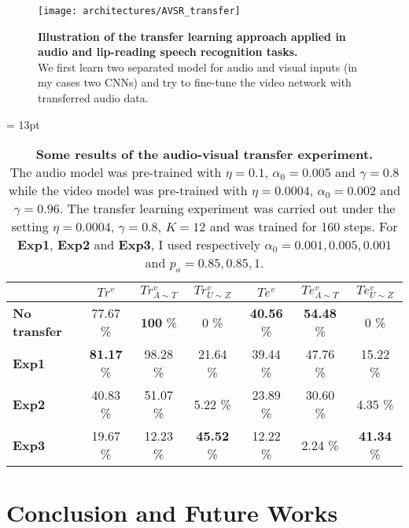 \begin{figure}[H]
  \centering
  \texttt{[image: architectures/AVSR\_transfer]}\\[-1em]
  \caption{%
    \textbf{Illustration of the transfer learning approach applied in
      audio and lip-reading speech recognition tasks.}\\[0.1em]
    We first learn two separated model for audio and visual inputs
      (in my cases two CNNs) and try to fine-tune the video network
      with transferred audio data.
    }
  \label{fig:AVSR_transfer}
\end{figure}

\begin{table}[H]
  \tabcolsep = 13pt
  \caption{\textbf{Some results of the audio-visual transfer experiment.}
    \\[0.1em]
  The audio model was pre-trained with $\eta=0.1$, $\alpha_0=0.005$ and
  $\gamma=0.8$ while the video model was pre-trained with $\eta=0.0004$,
  $\alpha_0=0.002$ and $\gamma=0.96$. The transfer learning experiment
  was carried out under the setting $\eta=0.0004$, $\gamma=0.8$, $K=12$
  and was trained for 160 steps.
  For \textbf{Exp1}, \textbf{Exp2} and \textbf{Exp3}, I used respectively
  $\alpha_0 = 0.001, 0.005, 0.001$ and $p_a = 0.85, 0.85, 1$.
  }
  \label{tab:AVSR_transfer}
  \begin{tabular*}{\linewidth}{>{\bf}lcccccc}
    \toprule
    & $Tr^v$ & $Tr^v_{A\sim T}$ & $Tr^v_{U\sim Z}$
    & $Te^v$ & $Te^v_{A\sim T}$ & $Te^v_{U\sim Z}$\\
    \midrule
    No transfer & 77.67 \% & \textbf{100} \% & 0 \% & \textbf{40.56} \%
    & \textbf{54.48} \% & 0 \% \\
    Exp1 & \textbf{81.17} \% & 98.28 \% & 21.64 \% & 39.44 \%
    & 47.76 \% & 15.22 \% \\
    Exp2 &  40.83 \% & 51.07 \% & 5.22 \% & 23.89 \%
    & 30.60 \% & 4.35 \% \\
    Exp3 & 19.67 \% & 12.23 \% & \textbf{45.52} \% & 12.22 \%
    & 2.24 \% & \textbf{41.34} \% \\
    \bottomrule
  \end{tabular*}
\end{table}

\section{Conclusion and Future Works} \label{section:conclusion}
